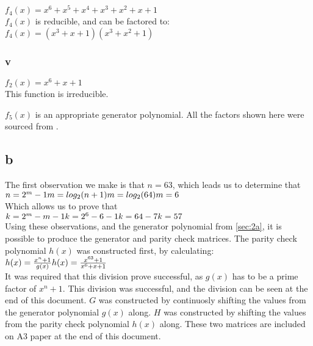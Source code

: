 $f_{4}(x) = x^{6} + x^{5} + x^{4} + x^{3} + x^{2} + x + 1$ \\

\noindent $f_{4}(x)$ is reducible, and can be factored to: \\

\noindent $f_{4}(x) = (x^{3} + x + 1)(x^{3} + x^{2} + 1)$

\subsubsection{v}

$f_{2}(x) = x^{6} + x + 1$ \\

\noindent This function is irreducible.

$f_{5}(x)$ is an appropriate generator polynomial.
All the factors shown here were sourced from \cite{website:Polynomials}.

\subsection{b}
The first observation we make is that $n = 63$, which leads us to determine that \\ $ n = 2^{m}-1 \\ m = log_{2}(n+1) \\ m = log_{2}(64) \\ m = 6$ \\
Which allows us to prove that \\ $k = 2^{m} - m - 1 \\ k = 2^{6} - 6 - 1 \\ k = 64 - 7 \\ k = 57$ \\
Using these observations, and the generator polynomial from \ref{sec:2a}, it is possible to produce the generator and parity check matrices.
The parity check polynomial $h(x)$ was constructed first, by calculating: \\
$h(x) = \frac{x^{n} + 1}{g(x)} \\ 
h(x) = \frac{x^{63} + 1}{x^{6} + x + 1}$\\

It was required that this division prove successful, as $g(x)$ has to be a prime factor of $x^{n} + 1$.
This division was successful, and the division can be seen at the end of this document.
$G$ was constructed by continuosly shifting the values from the generator polynomial $g(x)$ along.
$H$ was constructed by shifting the values from the parity check polynomial $h(x)$ along.
These two matrices are included on A3 paper at the end of this document.

